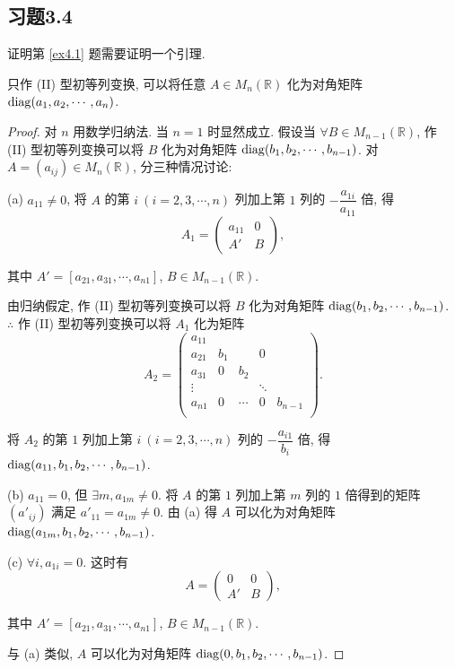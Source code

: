 \documentclass[color=black,device=normal,lang=cn,mode=geye]{elegantnote}
\begin{document}
\subsection{习题3.4}
证明第 \ref{ex4.1} 题需要证明一个引理.
\begin{lemma}\label{l5.2}
    只作 (II) 型初等列变换, 可以将任意 $A\in M_n(\mathbb{R})$ 化为对角矩阵 $\operatorname{diag}(a_1,a_2,\cdots,a_n)$.
\end{lemma}
\begin{proof}
    对 $n$ 用数学归纳法. 当 $n=1$ 时显然成立. 假设当 $\forall B\in M_{n-1}(\mathbb{R})$, 作 (II) 型初等列变换可以将 $B$ 化为对角矩阵 $\operatorname{diag}(b_1,b_2,\cdots,b_{n-1})$. 对 $A=(a_{ij})\in M_n(\mathbb{R})$, 分三种情况讨论:

    (a) $a_{11}\neq0$, 将 $A$ 的第 $i\ (i=2,3,\cdots,n)$ 列加上第 $1$ 列的 $-\dfrac{a_{1i}}{a_{11}}$ 倍, 得
    \[A_1=\begin{pmatrix}
        a_{11} & 0 \\
        A' & B
    \end{pmatrix},\]

    其中 $A'=[a_{21},a_{31},\cdots,a_{n1}]$, $B\in M_{n-1}(\mathbb{R})$.
    
    由归纳假定, 作 (II) 型初等列变换可以将 $B$ 化为对角矩阵 $\operatorname{diag}(b_1,b_2,\cdots,b_{n-1})$. $\therefore$ 作 (II) 型初等列变换可以将 $A_1$ 化为矩阵
    \[A_2=\begin{pmatrix}
        a_{11} \\
        a_{21} & b_1 && 0 \\
        a_{31} & 0 & b_2 \\
        \vdots &&& \ddots \\
        a_{n1} & 0 & \cdots & 0 & b_{n-1} \\
    \end{pmatrix}.\]

    将 $A_2$ 的第 $1$ 列加上第 $i\ (i=2,3,\cdots,n)$ 列的 $-\dfrac{a_{i1}}{b_i}$ 倍, 得 $\operatorname{diag}(a_{11},b_1,b_2,\cdots,b_{n-1})$.

    (b) $a_{11}=0$, 但 $\exists m,a_{1m}\neq0$. 将 $A$ 的第 $1$ 列加上第 $m$ 列的 $1$ 倍得到的矩阵 $(a'_{ij})$ 满足 $a'_{11}=a_{1m}\neq0$. 由 (a) 得 $A$ 可以化为对角矩阵 $\operatorname{diag}(a_{1m},b_1,b_2,\cdots,b_{n-1})$.

    (c) $\forall i,a_{1i}=0$. 这时有
    \[A=\begin{pmatrix}
        0 & 0 \\
        A' & B
    \end{pmatrix},\]

    其中 $A'=[a_{21},a_{31},\cdots,a_{n1}]$, $B\in M_{n-1}(\mathbb{R})$.
    
    与 (a) 类似, $A$ 可以化为对角矩阵 $\operatorname{diag}(0,b_1,b_2,\cdots,b_{n-1})$.
\end{proof}
\end{document}
